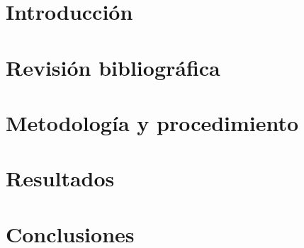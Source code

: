 \documentclass[12pt]{article}
\begin{document}
\thispagestyle{empty}
\tableofcontents
\pagebreak

\setcounter{page}{1}
\section{Introducción}

\newpage

\section{Revisión bibliográfica}


\section{Metodología y procedimiento}


\section{Resultados}


\section{Conclusiones}


\newpage


\end{document}
